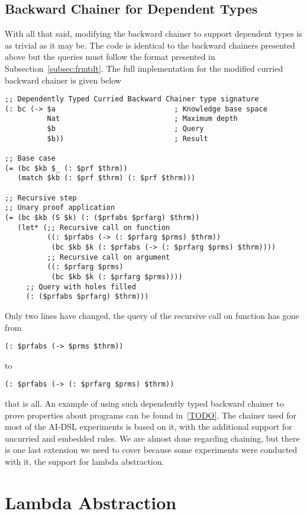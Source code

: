 \documentclass[]{report}
\begin{document}
\subsection{Backward Chainer for Dependent Types}

With all that said, modifying the backward chainer to support
dependent types is as trivial as it may be.  The code is identical to
the backward chainers presented above but the queries must follow the
format presented in Subsection~\ref{subsec:frmtdt}.  The full
implementation for the modified curried backward chainer is given
below
\begin{verbatim}
;; Dependently Typed Curried Backward Chainer type signature
(: bc (-> $a                            ; Knowledge base space
          Nat                           ; Maximum depth
          $b                            ; Query
          $b))                          ; Result

;; Base case
(= (bc $kb $_ (: $prf $thrm))
   (match $kb (: $prf $thrm) (: $prf $thrm)))

;; Recursive step
;; Unary proof application
(= (bc $kb (S $k) (: ($prfabs $prfarg) $thrm))
   (let* (;; Recursive call on function
          ((: $prfabs (-> (: $prfarg $prms) $thrm))
           (bc $kb $k (: $prfabs (-> (: $prfarg $prms) $thrm))))
          ;; Recursive call on argument
          ((: $prfarg $prms)
           (bc $kb $k (: $prfarg $prms))))
     ;; Query with holes filled
     (: ($prfabs $prfarg) $thrm)))
\end{verbatim}
Only two lines have changed, the query of the recursive call on
function has gone from
\begin{verbatim}
(: $prfabs (-> $prms $thrm))
\end{verbatim}
to
\begin{verbatim}
(: $prfabs (-> (: $prfarg $prms) $thrm))
\end{verbatim}
that is all.  An example of using such dependently typed backward
chainer to prove properties about programs can be found in~\ref{TODO}.
The chainer used for most of the AI-DSL experiments is based on it,
with the additional support for uncurried and embedded rules.  We are
almost done regarding chaining, but there is one last extension we
need to cover because some experiments were conducted with it, the
support for lambda abstraction.

\section{Lambda Abstraction}
\end{document}
